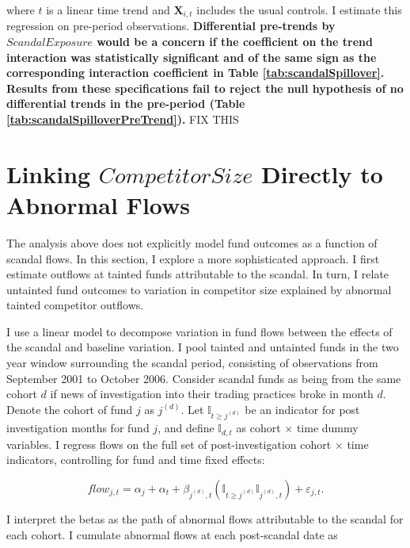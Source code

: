 \documentclass[openany]{book}
\theoremstyle{definition}
\theoremstyle{definition}
\theoremstyle{definition}
\theoremstyle{remark}
\begin{document}
where \(t\) is a linear time trend and \(\mathbf{X}_{i,t}\) includes the
usual controls. I estimate this regression on pre-period observations.
\textbf{Differential pre-trends by \(ScandalExposure\) would be a
concern if the coefficient on the trend interaction was statistically
significant and of the same sign as the corresponding interaction
coefficient in Table \ref{tab:scandalSpillover}. Results from these
specifications fail to reject the null hypothesis of no differential
trends in the pre-period (Table \ref{tab:scandalSpilloverPreTrend}).}
FIX THIS

\section{\texorpdfstring{Linking \(CompetitorSize\) Directly to Abnormal
Flows}{Linking CompetitorSize Directly to Abnormal Flows}}\label{sec:linkFlows}

The analysis above does not explicitly model fund outcomes as a function
of scandal flows. In this section, I explore a more sophisticated
approach. I first estimate outflows at tainted funds attributable to the
scandal. In turn, I relate untainted fund outcomes to variation in
competitor size explained by abnormal tainted competitor outflows.

I use a linear model to decompose variation in fund flows between the
effects of the scandal and baseline variation. I pool tainted and
untainted funds in the two year window surrounding the scandal period,
consisting of observations from September 2001 to October 2006. Consider
scandal funds as being from the same cohort \(d\) if news of
investigation into their trading practices broke in month \(d\). Denote
the cohort of fund \(j\) as \(j^{(d)}\). Let
\(\mathbb{I}_{t\geq j^{(d)}}\) be an indicator for post investigation
months for fund \(j\), and define \(\mathbb{I}_{d,t}\) as cohort
\(\times\) time dummy variables. I regress flows on the full set of
post-investigation cohort \(\times\) time indicators, controlling for
fund and time fixed effects:

\begin{equation}
flow_{j,t}=\alpha_j+\alpha_t +\beta_{j^{(d)},t} \left( \mathbb{I}_{t\geq j^{(d)}}\mathbb{I}_{j^{(d)},t} \right) + \varepsilon_{j,t}.
\label{eq:cohortReg}
\end{equation}

I interpret the betas as the path of abnormal flows attributable to the
scandal for each cohort. I cumulate abnormal flows at each post-scandal
date as
\end{document}
